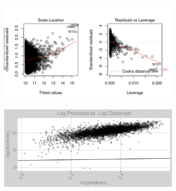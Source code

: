 \begin{figure}[h]
\centering
\begin{subfigure}{1\textwidth}
\centering
\includegraphics[width=.99\textwidth, height=0.425\textheight]{Images/electricity_psf_lp_res_2.png}
\end{subfigure}
\begin{subfigure}{1\textwidth}
\centering
\includegraphics[width=.99\textwidth, height=0.475\textheight]{Images/electricity_psf_lp_pvo.png}
\end{subfigure}
\end{figure}
\FloatBarrier
\newpage
